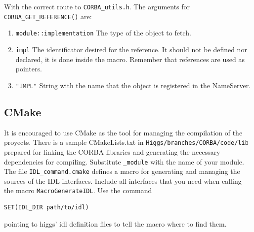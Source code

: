 With the correct route to \texttt{CORBA\_utils.h}. The arguments for \texttt{CORBA\_GET\_REFERENCE()} are:
\begin{enumerate}
\item \texttt{module::implementation} The type of the object to fetch.
\item \texttt{impl} The identificator desired for the reference. It should not be defined nor declared, it is done inside the macro. Remember that references are used as pointers.
\item \texttt{"IMPL"} String with the name that the object is registered in the NameServer.
\end{enumerate}




\subsection{CMake}
\label{ssec:cmake}
It is encouraged to use CMake as the tool for managing the compilation of the proyects. There is a sample CMakeLists.txt in \texttt{Higgs/branches/CORBA/code/lib}  prepared for linking the CORBA libraries and generating the necessary dependencies for compiling. Substitute \texttt{\_module} with the name of your module. The file \texttt{IDL\_command.cmake} defines a macro for generating and managing the sources of the IDL interfaces. Include all interfaces that you need when calling the macro \texttt{MacroGenerateIDL}.
Use the command
\begin{verbatim}
SET(IDL_DIR path/to/idl)
\end{verbatim}
pointing to higgs' idl definition files to tell the macro where to find them.


